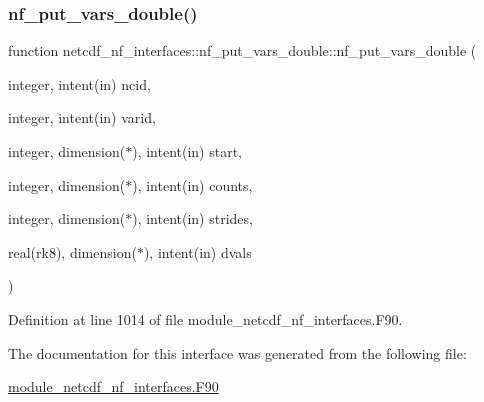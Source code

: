 \subsubsection{\texorpdfstring{nf\+\_\+put\+\_\+vars\+\_\+double()}{nf\_put\_vars\_double()}}
{\footnotesize\ttfamily function netcdf\+\_\+nf\+\_\+interfaces\+::nf\+\_\+put\+\_\+vars\+\_\+double\+::nf\+\_\+put\+\_\+vars\+\_\+double (\begin{DoxyParamCaption}\item[{integer, intent(in)}]{ncid,  }\item[{integer, intent(in)}]{varid,  }\item[{integer, dimension($\ast$), intent(in)}]{start,  }\item[{integer, dimension($\ast$), intent(in)}]{counts,  }\item[{integer, dimension($\ast$), intent(in)}]{strides,  }\item[{real(rk8), dimension($\ast$), intent(in)}]{dvals }\end{DoxyParamCaption})}



Definition at line 1014 of file module\+\_\+netcdf\+\_\+nf\+\_\+interfaces.\+F90.



The documentation for this interface was generated from the following file\+:\begin{DoxyCompactItemize}
\item 
\hyperlink{module__netcdf__nf__interfaces_8F90}{module\+\_\+netcdf\+\_\+nf\+\_\+interfaces.\+F90}\end{DoxyCompactItemize}
